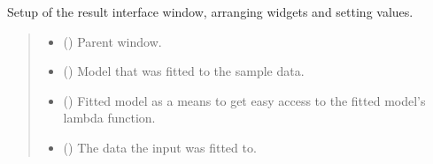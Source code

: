 \documentclass[letterpaper,10pt,english]{sphinxmanual}
\begin{document}
\begin{fulllineitems}
\begin{fulllineitems}
\label{\detokenize{CTkResultInterface:src.CTkResultInterface.ResultInterface.__init__}}
\pysigstartsignatures
{}
\pysigstopsignatures
\sphinxAtStartPar
Setup of the result interface window, arranging widgets and setting values.
\begin{quote}\begin{description}
\begin{itemize}
\item {} 
\sphinxAtStartPar
{} ({\hyperref[\detokenize{CTkInterface:src.CTkInterface.MainApp}]{}}) \textendash{} Parent window.

\item {} 
\sphinxAtStartPar
{} ({\hyperref[\detokenize{VPCModel:src.VPCModel.VPCModel}]{}}) \textendash{} Model that was fitted to the sample data.

\item {} 
\sphinxAtStartPar
{} ({\hyperref[\detokenize{VPCModel:src.VPCModel.VPCModel}]{}}) \textendash{} Fitted model as a means to get easy access to the fitted model’s lambda function.

\item {} 
\sphinxAtStartPar
{} (\sphinxstyleliteralemphasis{\sphinxupquote{{[}}}\sphinxstyleliteralemphasis{\sphinxupquote{{[}}}\sphinxstyleliteralemphasis{\sphinxupquote{ | }}\sphinxstyleliteralemphasis{\sphinxupquote{{]}}}\sphinxstyleliteralemphasis{\sphinxupquote{{]}}}) \textendash{} The data the input was fitted to.


\end{itemize}
\end{description}
\end{quote}
\end{fulllineitems}
\end{fulllineitems}
\end{document}
